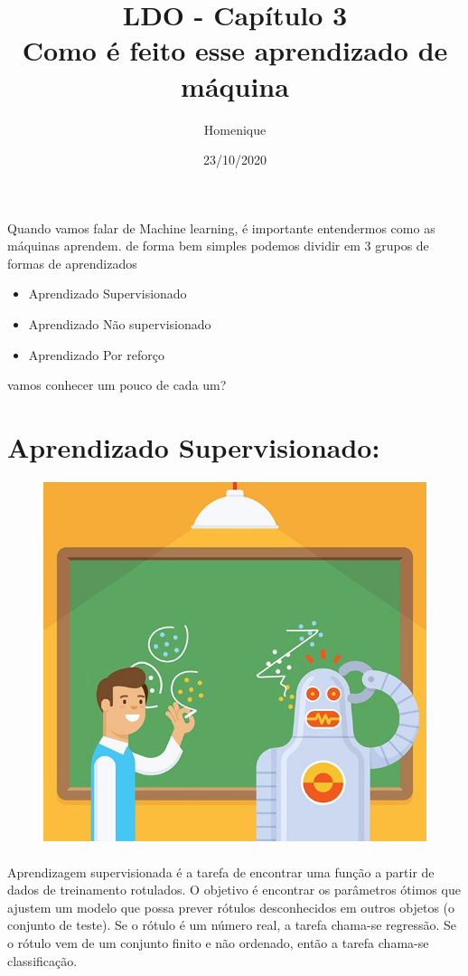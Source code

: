 \documentclass{article}
\title{\textbf{LDO - Capítulo 3\\
Como é feito esse aprendizado de máquina}}
\author{Homenique}
\date{23/10/2020}
\begin{document}
    \maketitle

    Quando vamos falar de Machine learning, é importante entendermos como as máquinas aprendem. de forma bem simples podemos dividir em 3 grupos de formas de aprendizados 
    \begin{itemize}
    \item 
    Aprendizado Supervisionado 
    \item Aprendizado Não supervisionado
    \item Aprendizado Por reforço
    \end{itemize}
    vamos conhecer um pouco de cada um?
    
            \section*{\centering Aprendizado Supervisionado:}\label{sec:Aprendizado_Supervisionado}
            
            \begin{figure}[ht]
            \centering
            \includegraphics[scale=0.4]{robo_aprendedo.jpg}               
            \end{figure}
            

            \paragraph{}Aprendizagem supervisionada é a tarefa de encontrar uma função a partir de dados de treinamento rotulados. O objetivo é encontrar os parâmetros ótimos que ajustem um modelo que possa prever rótulos desconhecidos em outros objetos (o conjunto de teste). Se o rótulo é um número real, a tarefa chama-se regressão. Se o rótulo vem de um conjunto finito e não ordenado, então a tarefa chama-se classificação.
                
\end{document}
